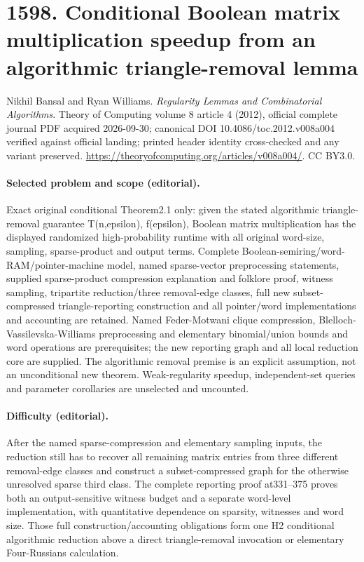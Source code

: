 \documentclass[10pt]{article}
\theoremstyle{definition}
\numberwithin{equation}{section}
\begin{document}
\begingroup\raggedright
\section*{1598. Conditional Boolean matrix multiplication speedup from an algorithmic triangle-removal lemma}
Nikhil Bansal and Ryan Williams. \emph{Regularity Lemmas and Combinatorial Algorithms}. Theory of Computing volume 8 article 4 (2012), official complete journal PDF acquired 2026-09-30; canonical DOI 10.4086/toc.2012.v008a004 verified against official landing; printed header identity cross-checked and any variant preserved. \url{https://theoryofcomputing.org/articles/v008a004/}. CC BY3.0.
\paragraph{Selected problem and scope (editorial).} Exact original conditional Theorem2.1 only: given the stated algorithmic triangle-removal guarantee T(n,epsilon), f(epsilon), Boolean matrix multiplication has the displayed randomized high-probability runtime with all original word-size, sampling, sparse-product and output terms. Complete Boolean-semiring/word-RAM/pointer-machine model, named sparse-vector preprocessing statements, supplied sparse-product compression explanation and folklore proof, witness sampling, tripartite reduction/three removal-edge classes, full new subset-compressed triangle-reporting construction and all pointer/word implementations and accounting are retained. Named Feder-Motwani clique compression, Blelloch-Vassilevska-Williams preprocessing and elementary binomial/union bounds and word operations are prerequisites; the new reporting graph and all local reduction core are supplied. The algorithmic removal premise is an explicit assumption, not an unconditional new theorem. Weak-regularity speedup, independent-set queries and parameter corollaries are unselected and uncounted.
\paragraph{Difficulty (editorial).} After the named sparse-compression and elementary sampling inputs, the reduction still has to recover all remaining matrix entries from three different removal-edge classes and construct a subset-compressed graph for the otherwise unresolved sparse third class. The complete reporting proof at331–375 proves both an output-sensitive witness budget and a separate word-level implementation, with quantitative dependence on sparsity, witnesses and word size. Those full construction/accounting obligations form one H2 conditional algorithmic reduction above a direct triangle-removal invocation or elementary Four-Russians calculation.
\end{document}
